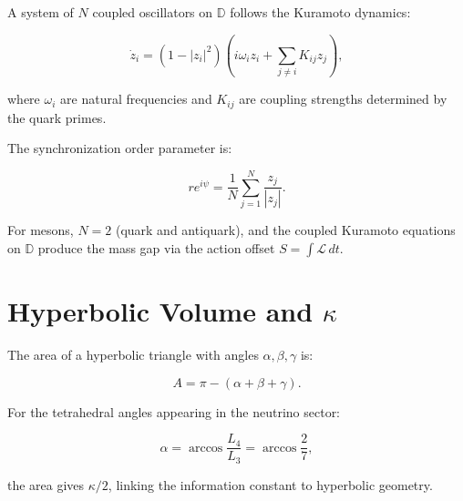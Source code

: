 A system of $N$ coupled oscillators on $\mathbb{D}$ follows the Kuramoto
dynamics:

\[
\dot{z}_i = (1 - |z_i|^2)\left(i\omega_i z_i + \sum_{j\neq i} K_{ij} z_j\right),
\]

where $\omega_i$ are natural frequencies and $K_{ij}$ are coupling
strengths determined by the quark primes.

The synchronization order parameter is:

\[
r e^{i\psi} = \frac{1}{N}\sum_{j=1}^N \frac{z_j}{|z_j|}.
\]

For mesons, $N=2$ (quark and antiquark), and the coupled Kuramoto
equations on $\mathbb{D}$ produce the mass gap via the action offset
$S = \int \mathcal{L}\,dt$.

\section{Hyperbolic Volume and $\kappa$}

The area of a hyperbolic triangle with angles $\alpha,\beta,\gamma$ is:

\[
A = \pi - (\alpha + \beta + \gamma).
\]

For the tetrahedral angles appearing in the neutrino sector:

\[
\alpha = \arccos\frac{L_4}{L_3} = \arccos\frac{2}{7},
\]

the area gives $\kappa/2$, linking the information constant to hyperbolic
geometry.
